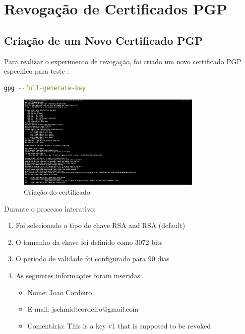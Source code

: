 \chapter{Revogação de Certificados PGP}

\section{Criação de um Novo Certificado PGP}
Para realizar o experimento de revogação, foi criado um novo certificado PGP específico para teste \cite{gnupgdoc}:

\begin{lstlisting}[language=bash]
gpg --full-generate-key
\end{lstlisting}

\begin{figure}[htb]
    \centering
    \includegraphics[width=0.8\textwidth]{images/02-criacao_novo_certificado_pgp.jpg}
    \caption{Criação do certificado}
    \label{fig:criacao-certificado}
\end{figure}

Durante o processo interativo:
\begin{enumerate}
    \item Foi selecionado o tipo de chave RSA and RSA (default)
    \item O tamanho da chave foi definido como 3072 bits
    \item O período de validade foi configurado para 90 dias
    \item As seguintes informações foram inseridas:
    \begin{itemize}
        \item Nome: Joao Cordeiro
        \item E-mail: jschmidtcordeiro@gmail.com
        \item Comentário: This is a key v1 that is supposed to be revoked
    \end{itemize}
\end{enumerate}

